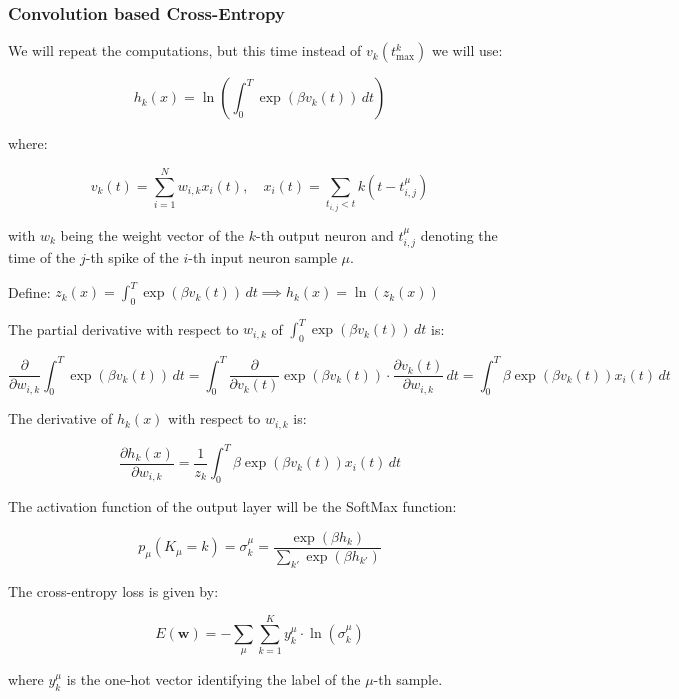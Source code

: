 \subsubsection{Convolution based Cross-Entropy}

We will repeat the computations, but this time instead of \(v_k(t_{\text{max}}^k)\) we will use:

\begin{equation}
    h_k(x) = \ln\left(\int_0^T \exp(\beta v_k(t))\, dt\right)
\end{equation}

where:

\begin{equation}
    v_k(t) = \sum_{i=1}^N w_{i,k} x_i(t), \quad x_i(t) = \sum_{t_{i,j} < t} k(t - t_{i,j}^\mu) 
\end{equation}

with \(w_k\) being the weight vector of the \(k\)-th output neuron and \(t_{i,j}^\mu\) denoting the time of the \(j\)-th spike of the \(i\)-th input neuron sample \(\mu\).

Define: \(z_k(x) = \int_0^T \exp(\beta v_k(t))\, dt \implies h_k(x) = \ln(z_k(x))\)

The partial derivative with respect to \(w_{i,k}\) of \(\int_0^T \exp(\beta v_k(t))\, dt\) is:

\begin{equation}
    \frac{\partial}{\partial w_{i,k}} \int_0^T \exp(\beta v_k(t))\, dt = \int_0^T \frac{\partial}{\partial v_k(t)} \exp(\beta v_k(t))\cdot \frac{\partial v_k(t)}{\partial w_{i,k}}\, dt = \int_0^T \beta \exp(\beta v_k(t)) x_i(t)\, dt
\end{equation}

The derivative of \(h_k(x)\) with respect to \(w_{i,k}\) is:

\begin{equation}
    \frac{\partial h_k(x)}{\partial w_{i,k}} = \frac{1}{z_k} \int_0^T \beta \exp(\beta v_k(t)) x_i(t)\, dt
\end{equation}

The activation function of the output layer will be the SoftMax function:

\begin{equation}
    p_\mu(K_\mu = k) = \sigma_k^\mu = \frac{\exp(\beta h_k)}{\sum_{k'} \exp(\beta h_{k'})}
\end{equation}

The cross-entropy loss is given by:

\begin{equation}
    E(\mathbf{w}) = -\sum_\mu \sum_{k=1}^K y_k^\mu \cdot \ln(\sigma_k^\mu)
\end{equation}

where \(y_k^\mu\) is the one-hot vector identifying the label of the \(\mu\)-th sample.
